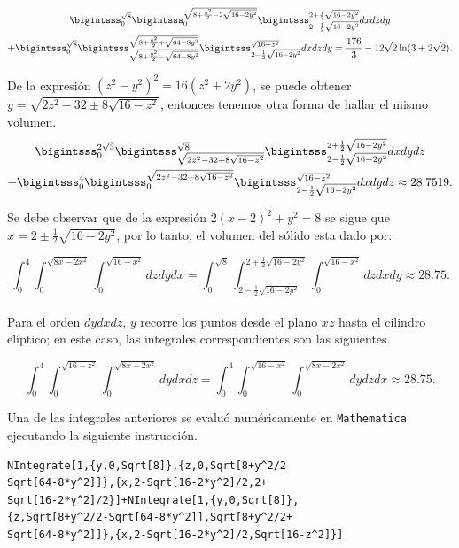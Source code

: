 {\small
\begin{multline*}
\bigintsss_{0}^{\sqrt{8}}\bigintsss_{0}^{\sqrt{8+\frac{y^2}{2}-2\sqrt{16-2y^2}}}\bigintsss_{2-\frac{1}{2}\sqrt{16-2y^2}}^{2+\frac{1}{2}\sqrt{16-2y^2}}dxdzdy \\
+\bigintsss_{0}^{\sqrt{8}}\bigintsss_{\sqrt{8+\frac{y^2}{2}-\sqrt{64-8y^2}}}^{\sqrt{8+\frac{y^2}{2}+\sqrt{64-8y^2}}}\bigintsss_{2-\frac{1}{2}\sqrt{16-2y^2}}^{\sqrt{16-z^2}}dxdzdy = \frac{176}{3}-12\sqrt{2}\ln( 3+2\sqrt{2}).
\end{multline*}
}

De la expresión $\left( z^2-y^2\right) ^2=16\left( z^2+2y^2\right)$, se puede obtener \\
$y=\sqrt{2z^2-32\pm 8\sqrt{16-z^2}}$, entonces tenemos otra forma de hallar el mismo volumen.
\begin{multline*}
\bigintsss_{0}^{2\sqrt{3}}\bigintsss_{\sqrt{2z^2-32+8\sqrt{16-z^2}}}^{\sqrt{8}}\bigintsss_{2-\frac{1}{2}\sqrt{16-2y^2}}^{2+\frac{1}{2}\sqrt{16-2y^2}}dxdydz \\
+\bigintsss_{0}^{4}\bigintsss_{0}^{\sqrt{2z^2-32+8\sqrt{16-z^2}}}\bigintsss_{2-\frac{1}{2}\sqrt{16-2y^2}}^{\sqrt{16-z^2}}dxdydz \approx 28.7519.
\end{multline*}

Se debe observar que de la expresión $2( x-2) ^2+y^2=8$ se sigue que $x=2\pm \frac{1}{2}\sqrt{16-2y^2}$,
por lo tanto, el volumen del sólido esta dado por:

{\small
\[
\int_{\scriptscriptstyle 0}^{\scriptscriptstyle 4}\int_{\scriptscriptstyle 0}^{\scriptscriptstyle\sqrt{8x-2x^2}}\int_{\scriptscriptstyle 0}^{\scriptscriptstyle\sqrt{16-x^2}}dzdydx \! = \! \int_{\scriptscriptstyle 0}^{\scriptscriptstyle\sqrt{8}}\int_{\scriptscriptstyle 2-\frac{1}{2}\sqrt{16-2y^2}}^{\scriptscriptstyle 2+\frac{1}{2}\sqrt{16-2y^2}}\int_{\scriptscriptstyle 0}^{\scriptscriptstyle\sqrt{16-x^2}}dzdxdy \! \approx \! 28.75.
\]
}
\\
Para el orden $dydxdz$, $y$ recorre los puntos desde el plano $xz$ hasta el cilindro elíptico; en este caso, las integrales correspondientes son las siguientes.

{\small
\[\int_{0}^{4}\int_{0}^{\sqrt{16-z^2}}\int_{0}^{\sqrt{8x-2x^2}}dydxdz=\int_{0}^{4}\int_{0}^{\sqrt{16-x^2}}\int_{0}^{\sqrt{8x-2x^2}}dydzdx \approx 28.75.\]
}

Una de las integrales anteriores se evaluó numéricamente en \verb"Mathematica"
ejecutando la siguiente instrucción.

\begin{tcolorbox}[title=\bf Instrucción en \verb"Mathematica"]\begin{Verbatim}[formatcom=\letraverbatim]
NIntegrate[1,{y,0,Sqrt[8]},{z,0,Sqrt[8+y^2/2
Sqrt[64-8*y^2]]},{x,2-Sqrt[16-2*y^2]/2,2+
Sqrt[16-2*y^2]/2}]+NIntegrate[1,{y,0,Sqrt[8]},
{z,Sqrt[8+y^2/2-Sqrt[64-8*y^2]],Sqrt[8+y^2/2+
Sqrt[64-8*y^2]]},{x,2-Sqrt[16-2*y^2]/2,Sqrt[16-z^2]}]
\end{Verbatim}
\end{tcolorbox}

